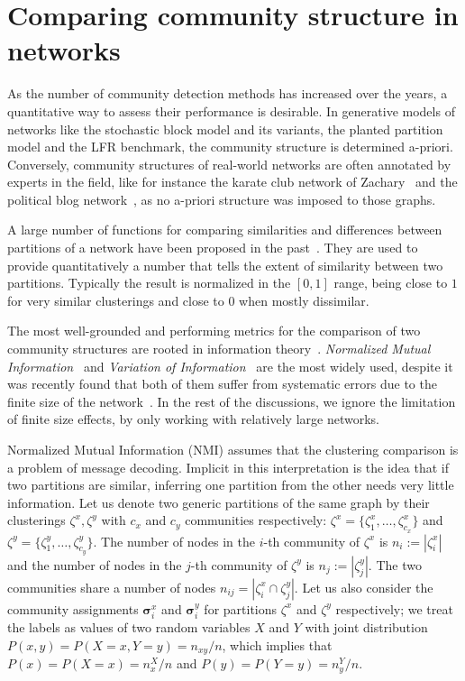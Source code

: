 \section{Comparing community structure in networks}
As the number of community detection methods has increased over the years, a quantitative way to assess their performance is desirable.
In generative models of networks like the stochastic block model and its variants, the planted partition model and the LFR benchmark, the community structure is determined a-priori.
Conversely, community structures of real-world networks are often annotated by experts in the field, like for instance the karate club network of Zachary~\cite{zachary1977} and the political blog network~\cite{adamic2005}, as no a-priori structure was imposed to those graphs.

A large number of functions for comparing similarities and differences between partitions of a network have been proposed in the past~\cite{danon2005,vinh2010}.
They are used to provide quantitatively a number that tells the extent of similarity between two partitions.
Typically the result is normalized in the $[0,1]$ range, being close to $1$ for very similar clusterings and close to $0$ when mostly dissimilar.

The most well-grounded and performing metrics for the comparison of two community structures are rooted in information theory~\cite{danon2005,vinh2010,cover2006}.
\emph{Normalized Mutual Information}~\cite{danon2005} and \emph{Variation of Information}~\cite{meila2007} are the most widely used, despite it was recently found that both of them suffer from systematic errors due to the finite size of the network~\cite{zhang2015a}.
In the rest of the discussions, we ignore the limitation of finite size effects, by only working with relatively large networks.

Normalized Mutual Information (NMI) assumes that the clustering comparison is a problem of message decoding.
Implicit in this interpretation is the idea that if two partitions are similar, inferring one partition from the other needs very little information.
Let us denote two generic partitions of the same graph by their clusterings $\zeta^x,\zeta^y$ with $c_x$ and $c_y$ communities respectively: $\zeta^x=\{\zeta^x_1,\ldots,\zeta^x_{c_x}\}$ and $\zeta^y=\{\zeta^y_1,\ldots,\zeta^y_{c_y}\}$.
The number of nodes in the $i$-th community of $\zeta^x$ is $n_i :=|\zeta^x_i|$ and the number of nodes in the $j$-th community of $\zeta^y$ is $n_j:=|\zeta^y_j|$.
The two communities share a number of nodes $n_{ij}=| \zeta^x_i \cap \zeta^y_j|$.
Let us also consider the community assignments $\boldsymbol\sigma^x_i$ and $\boldsymbol\sigma^y_i$ for partitions $\zeta^x$ and $\zeta^y$ respectively; we treat the labels as values of two random variables $X$ and $Y$ with joint distribution $P(x,y)=P(X=x, Y=y) = n_{xy}/n$, which implies that $P(x)=P(X=x)=n_x^X/n$ and $P(y)=P(Y=y)=n_y^Y/n$.

